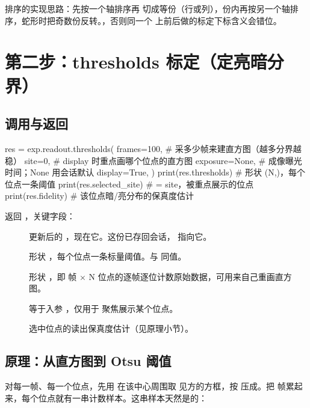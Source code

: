 \documentclass[11pt,oneside,openany]{book}
\begin{document}
排序的实现思路：先按一个轴排序再  切成等份（行或列），份内再按另一个轴排序，蛇形时把奇数份反转。，否则同一个  上前后做的标定下标含义会错位。

\section{第二步：thresholds 标定（定亮暗分界）}

\subsection{调用与返回}

\begin{codeblock}[Python]
res = exp.readout.thresholds(
    frames=100,     # 采多少帧来建直方图（越多分界越稳）
    site=0,         # display 时重点画哪个位点的直方图
    exposure=None,  # 成像曝光时间；None 用会话默认
    display=True,
)
print(res.thresholds)       # 形状 (N,)，每个位点一条阈值
print(res.selected_site)    # = site，被重点展示的位点
print(res.fidelity)         # 该位点暗/亮分布的保真度估计
\end{codeblock}

返回 ，关键字段：

\begin{description}
\item[] 更新后的 ，现在它。这份已存回会话， 指向它。
\item[] 形状 ，每个位点一条标量阈值。与  同值。
\item[] 形状 ，即  帧 × N 位点的逐帧逐位计数原始数据，可用来自己重画直方图。
\item[] 等于入参 ，仅用于  聚焦展示某个位点。
\item[] 选中位点的读出保真度估计（见原理小节）。
\end{description}

\subsection{原理：从直方图到 Otsu 阈值}

对每一帧、每一个位点，先用  在该中心周围取  见方的方框，按  压成。把  帧累起来，每个位点就有一串计数样本。这串样本天然是的：
\end{document}
